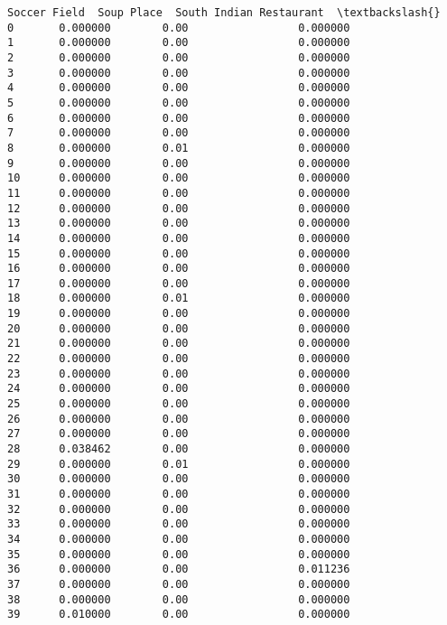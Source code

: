 \documentclass[11pt]{article}
\begin{document}
\begin{tcolorbox}[breakable, size=fbox, boxrule=.5pt, pad at break*=1mm, opacityfill=0]
\begin{Verbatim}[commandchars=\\\{\}]
    Soccer Field  Soup Place  South Indian Restaurant  \textbackslash{}
0       0.000000        0.00                 0.000000
1       0.000000        0.00                 0.000000
2       0.000000        0.00                 0.000000
3       0.000000        0.00                 0.000000
4       0.000000        0.00                 0.000000
5       0.000000        0.00                 0.000000
6       0.000000        0.00                 0.000000
7       0.000000        0.00                 0.000000
8       0.000000        0.01                 0.000000
9       0.000000        0.00                 0.000000
10      0.000000        0.00                 0.000000
11      0.000000        0.00                 0.000000
12      0.000000        0.00                 0.000000
13      0.000000        0.00                 0.000000
14      0.000000        0.00                 0.000000
15      0.000000        0.00                 0.000000
16      0.000000        0.00                 0.000000
17      0.000000        0.00                 0.000000
18      0.000000        0.01                 0.000000
19      0.000000        0.00                 0.000000
20      0.000000        0.00                 0.000000
21      0.000000        0.00                 0.000000
22      0.000000        0.00                 0.000000
23      0.000000        0.00                 0.000000
24      0.000000        0.00                 0.000000
25      0.000000        0.00                 0.000000
26      0.000000        0.00                 0.000000
27      0.000000        0.00                 0.000000
28      0.038462        0.00                 0.000000
29      0.000000        0.01                 0.000000
30      0.000000        0.00                 0.000000
31      0.000000        0.00                 0.000000
32      0.000000        0.00                 0.000000
33      0.000000        0.00                 0.000000
34      0.000000        0.00                 0.000000
35      0.000000        0.00                 0.000000
36      0.000000        0.00                 0.011236
37      0.000000        0.00                 0.000000
38      0.000000        0.00                 0.000000
39      0.010000        0.00                 0.000000


\end{Verbatim}
\end{tcolorbox}
\end{document}

